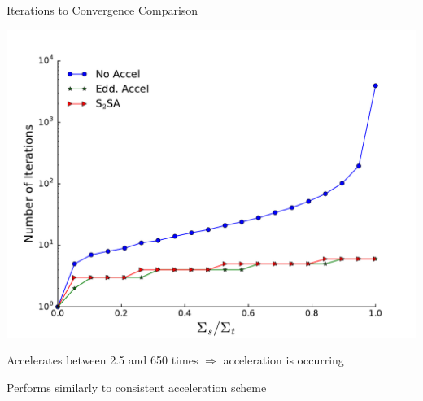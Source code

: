 \documentclass[10pt]{beamer}
\begin{document}
\begin{frame}{Iterations to Convergence Comparison}

    \centerline{\includegraphics[width=.7\paperwidth]{figs/accel.pdf}}

    Accelerates between 2.5 and 650 times $\Rightarrow$ acceleration is occurring 

    Performs similarly to consistent acceleration scheme 

\end{frame}
\end{document}
